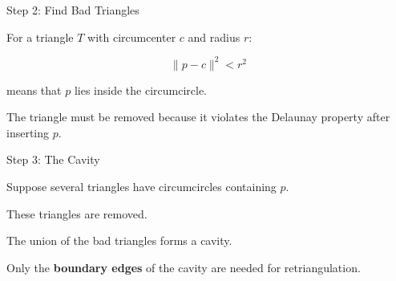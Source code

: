 \documentclass[aspectratio=169]{beamer}
\begin{document}
\begin{frame}{Step 2: Find Bad Triangles}

For a triangle $T$ with circumcenter $c$ and radius $r$:

\[
\|p-c\|^2 < r^2
\]

means that $p$ lies inside the circumcircle.

\begin{center}
\end{center}

The triangle must be removed because it violates the Delaunay property
after inserting $p$.

\end{frame}

\begin{frame}{Step 3: The Cavity}

Suppose several triangles have circumcircles containing $p$.

These triangles are removed.

\begin{center}
\end{center}

The union of the bad triangles forms a cavity.

\vspace{0.2cm}

Only the \textbf{boundary edges} of the cavity are needed for
retriangulation.

\end{frame}
\end{document}
